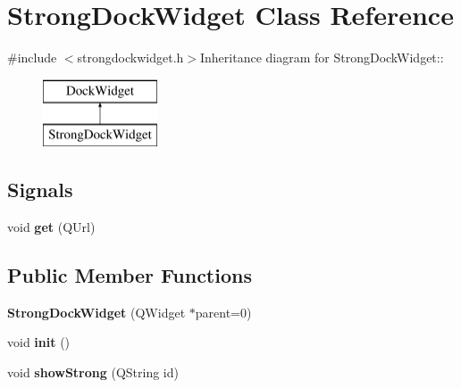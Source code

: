 \hypertarget{classStrongDockWidget}{
\section{StrongDockWidget Class Reference}
\label{classStrongDockWidget}
}


{\ttfamily \#include $<$strongdockwidget.h$>$}Inheritance diagram for StrongDockWidget::\begin{figure}[H]
\begin{center}
\leavevmode
\includegraphics[height=2cm]{classStrongDockWidget}
\end{center}
\end{figure}
\subsection*{Signals}
\begin{DoxyCompactItemize}
\item 
\hypertarget{classStrongDockWidget_a7002b5f175c25bf174bfe1c57c3a585a}{
void {\bfseries get} (QUrl)}
\label{classStrongDockWidget_a7002b5f175c25bf174bfe1c57c3a585a}

\end{DoxyCompactItemize}
\subsection*{Public Member Functions}
\begin{DoxyCompactItemize}
\item 
\hypertarget{classStrongDockWidget_abfb68051011c50c79404019c8ea54ab1}{
{\bfseries StrongDockWidget} (QWidget $\ast$parent=0)}
\label{classStrongDockWidget_abfb68051011c50c79404019c8ea54ab1}

\item 
\hypertarget{classStrongDockWidget_ae0aadb22296d0906d84168a448b31db6}{
void {\bfseries init} ()}
\label{classStrongDockWidget_ae0aadb22296d0906d84168a448b31db6}

\item 
\hypertarget{classStrongDockWidget_a0dbfec2c920d90c380b4641dde61611c}{
void {\bfseries showStrong} (QString id)}
\label{classStrongDockWidget_a0dbfec2c920d90c380b4641dde61611c}

\end{DoxyCompactItemize}
